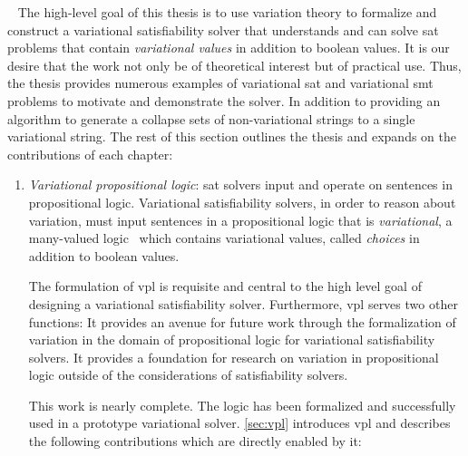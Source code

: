 ~\label{sec:prop-contr}
The high-level goal of this thesis is to use variation theory to formalize and
construct a variational satisfiability solver that understands and can solve
\ac{sat} problems that contain \emph{variational values} in addition to boolean
values. It is our desire that the work not only be of theoretical interest but
of practical use. Thus, the thesis provides numerous examples of variational
\ac{sat} and variational \ac{smt} problems to motivate and demonstrate the
solver. In addition to providing an algorithm to generate a collapse sets of
non-variational strings to a single variational string. The rest of this section
outlines the thesis and expands on the contributions of each chapter:
\begin{enumerate}
\item\label{vpl-deliverable} \emph{Variational propositional logic}: \ac{sat}
  solvers input and operate on sentences in propositional
  logic\cite{10.5555/1324777}. Variational satisfiability solvers, in order to
  reason about variation, must input sentences in a propositional logic that is
  \textit{variational}, \ie{} a many-valued logic~\cite{Rescher1969-RESML} which
  contains variational values, called \emph{choices} in addition to boolean
  values.

  The formulation of \ac{vpl} is requisite and central to the high level goal of
  designing a variational satisfiability solver. Furthermore, \ac{vpl} serves
  two other functions: It provides an avenue for future work through the
  formalization of variation in the domain of propositional logic for
  variational satisfiability solvers. It provides a foundation for research on
  variation in propositional logic outside of the considerations of
  satisfiability solvers.

  This work is nearly complete. The logic has been formalized and successfully
  used in a prototype variational solver\cite{10.1145/3382025.3414965}.
  \autoref{sec:vpl} introduces \ac{vpl} and describes the following
  contributions which are directly enabled by it:


\end{enumerate}
